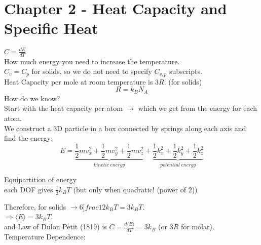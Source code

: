 \section{Chapter 2 - Heat Capacity and Specific Heat} 

		$C = \frac{dE}{dT}$ \\
		How much energy you need to increase the temperature.\\
		$C_v = C_p$ for solids, so we do not need to specify $C_{v,p}$ subscripts.\\
		Heat Capacity per mole at room temperature is $3R$. (for solids) \\
		\begin{equation*}
			R = k_B N_A
		\end{equation*}
		How do we know? \\
		Start with the heat capacity per atom $\rightarrow$ which we get from the energy for each atom. \\
		
		We construct a 3D particle in a box connected by springs along each axis and find the energy:
		\begin{equation*}
			E = \underbrace{\frac{1}{2} m v_x^2 + \frac{1}{2} m v_y^2 + \frac{1}{2} m v_z^2}_{kinetic\ energy} +
				\underbrace{\frac{1}{2} k_x^2 + \frac{1}{2} k_y^2 + \frac{1}{2} k_z^2}_{potential\ energy}
		\end{equation*}

		\underline{Equipartition of energy}\\
			each DOF gives $\frac{1}{2} k_B T$  (but only when quadratic!  (power of 2))
		
		Therefore, for solids $\rightarrow 6 ]frac{1}{2} k_B T = 3 k_B T$. \\
		$\Rightarrow \langle E\rangle = 3 k_B T$. \\
		and Law of Dulon Petit (1819) is $C = \frac{d \langle E\rangle}{dT} = 3k_B$ (or $3R$ for molar).\\
		
		Temperature Dependence:
